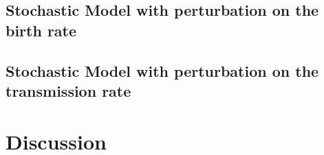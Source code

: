 \documentclass{article}
\begin{document}
\subsection{Stochastic Model with perturbation on the birth rate}


\subsection{Stochastic Model with perturbation on the transmission rate}


\section{Discussion}


\newpage
{}


\end{document}
